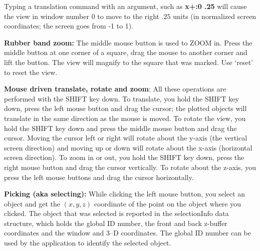 Typing a translation command with an argument, such as {\bf x+:0 .25}
will cause the view in window number 0 to move to the right $.25$ units
(in normalized screen coordinates; the screen goes from -1 to 1).

{\bf Rubber band zoom:}  The middle mouse
button is used to ZOOM in. Press the middle button at one corner of a
square, drag the mouse to another corner and lift the button.  The
view will magnify to the square that was marked.  Use `reset' to reset
the view.

{\bf Mouse driven translate, rotate and zoom}:  All these operations are performed
with the SHIFT key down. To translate, you hold the SHIFT key down,
press the left mouse button and drag the cursor; the plotted objects
will translate in the same direction as the mouse is moved. To rotate
the view, you hold the SHIFT key down and press the middle mouse
button and drag the cursor. Moving the cursor left or right will
rotate about the y-axis (the vertical screen direction) and moving up
or down will rotate about the x-axis (horizontal screen direction). To
zoom in or out, you hold the SHIFT key down, press the right mouse
button and drag the cursor vertically. To rotate about the z-axis, you
press the left mouse buttons and drag the cursor horizontally.

{\bf Picking (aka selecting):} While clicking the left mouse button,
you select an object and get the $(x,y,z)$ coordinate of the point on
the object where you clicked. The object that was selected is reported
in the selectionInfo data structure, which holds the global ID number,
the front and back z-buffer coordinates and the window and 3--D
coordinates. The global ID number can be used by the application to
identify the selected object.


